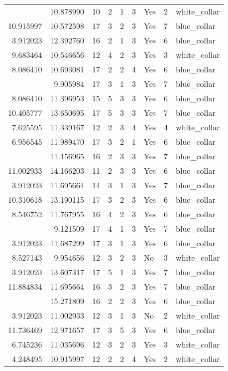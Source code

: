 \documentclass[
]{article}
\begin{document}
\begin{longtable}[t]{rrrrrllrl}
\addlinespace
3.912023 & 10.878990 & 10 & 2 & 1 & 3 & Yes & 2 & white\_collar\\
10.915997 & 10.572598 & 17 & 3 & 2 & 3 & Yes & 7 & blue\_collar\\
3.912023 & 12.392760 & 16 & 2 & 1 & 3 & Yes & 6 & blue\_collar\\
9.683464 & 10.546656 & 12 & 4 & 2 & 3 & Yes & 3 & white\_collar\\
8.086410 & 10.693081 & 17 & 2 & 2 & 4 & Yes & 6 & blue\_collar\\
\addlinespace
3.912023 & 9.905984 & 17 & 3 & 1 & 3 & Yes & 7 & blue\_collar\\
8.086410 & 11.396953 & 15 & 5 & 3 & 3 & Yes & 6 & blue\_collar\\
10.405777 & 13.650695 & 17 & 5 & 3 & 3 & Yes & 7 & blue\_collar\\
7.625595 & 11.339167 & 12 & 2 & 3 & 4 & Yes & 4 & white\_collar\\
6.956545 & 11.989470 & 17 & 3 & 2 & 1 & Yes & 6 & blue\_collar\\
\addlinespace
6.476972 & 11.156965 & 16 & 2 & 3 & 3 & Yes & 7 & blue\_collar\\
11.002933 & 14.166203 & 11 & 2 & 3 & 3 & Yes & 6 & blue\_collar\\
3.912023 & 11.695664 & 14 & 3 & 1 & 3 & Yes & 7 & blue\_collar\\
10.310618 & 13.190115 & 17 & 3 & 2 & 3 & Yes & 6 & blue\_collar\\
8.546752 & 11.767955 & 16 & 4 & 2 & 3 & Yes & 6 & blue\_collar\\
\addlinespace
3.912023 & 9.121509 & 17 & 4 & 1 & 3 & Yes & 7 & blue\_collar\\
3.912023 & 11.687299 & 17 & 3 & 1 & 3 & Yes & 6 & blue\_collar\\
8.527143 & 9.954656 & 12 & 3 & 2 & 3 & No & 3 & white\_collar\\
3.912023 & 13.607317 & 17 & 5 & 1 & 3 & Yes & 7 & blue\_collar\\
11.884834 & 11.695664 & 16 & 3 & 2 & 3 & Yes & 7 & blue\_collar\\
\addlinespace
12.139131 & 15.271809 & 16 & 2 & 2 & 3 & Yes & 6 & blue\_collar\\
3.912023 & 11.002933 & 12 & 3 & 1 & 3 & No & 2 & white\_collar\\
11.736469 & 12.971657 & 17 & 3 & 5 & 3 & Yes & 6 & blue\_collar\\
6.745236 & 11.035696 & 12 & 3 & 2 & 3 & Yes & 3 & white\_collar\\
4.248495 & 10.915997 & 12 & 2 & 2 & 4 & Yes & 2 & white\_collar\\

\end{longtable}
\end{document}
